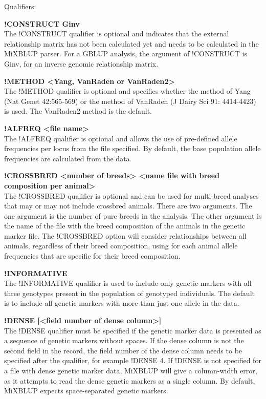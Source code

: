 Qualifiers:

\textbf{!CONSTRUCT Ginv}\\
The !CONSTRUCT qualifier is optional and indicates that the external
relationship matrix has not been calculated yet and needs to be
calculated in the MiXBLUP parser. For a GBLUP analysis, the argument of
!CONSTRUCT is Ginv, for an inverse genomic relationship matrix.

\textbf{!METHOD \textless Yang, VanRaden or VanRaden2\textgreater{}}\\
The !METHOD qualifier is optional and specifies whether the method of
Yang (Nat Genet 42:565-569) or the method of VanRaden (J Dairy Sci 91:
4414-4423) is used. The VanRaden2 method is the default.

\textbf{!ALFREQ \textless file name\textgreater{}}\\
The !ALFREQ qualifier is optional and allows the use of pre-defined
allele frequencies per locus from the file specified. By default, the
base population allele frequencies are calculated from the data.

\textbf{!CROSSBRED \textless number of breeds\textgreater{}
\textless name file with breed composition per animal\textgreater{}}\\
The !CROSSBRED qualifier is optional and can be used for multi-breed
analyses that may or may not include crossbred animals. There are two
arguments. The one argument is the number of pure breeds in the
analysis. The other argument is the name of the file with the breed
composition of the animals in the genetic marker file. The !CROSSBRED
option will consider relationships between all animals, regardless of
their breed composition, using for each animal allele frequencies that
are specific for their breed composition.

\textbf{!INFORMATIVE}\\
The !INFORMATIVE qualifier is used to include only genetic markers with
all three genotypes present in the population of genotyped individuals.
The default is to include all genetic markers with more than just one
allele in the data.

\textbf{!DENSE {[}\textless field number of dense
column\textgreater{]}}\\
The !DENSE qualifier must be specified if the genetic marker data is
presented as a sequence of genetic markers without spaces. If the dense
column is not the second field in the record, the field number of the
dense column needs to be specified after the qualifier, for example
!DENSE 4. If !DENSE is not specified for a file with dense genetic
marker data, MiXBLUP will give a column-width error, as it attempts to
read the dense genetic markers as a single column. By default, MiXBLUP
expects space-separated genetic markers.


